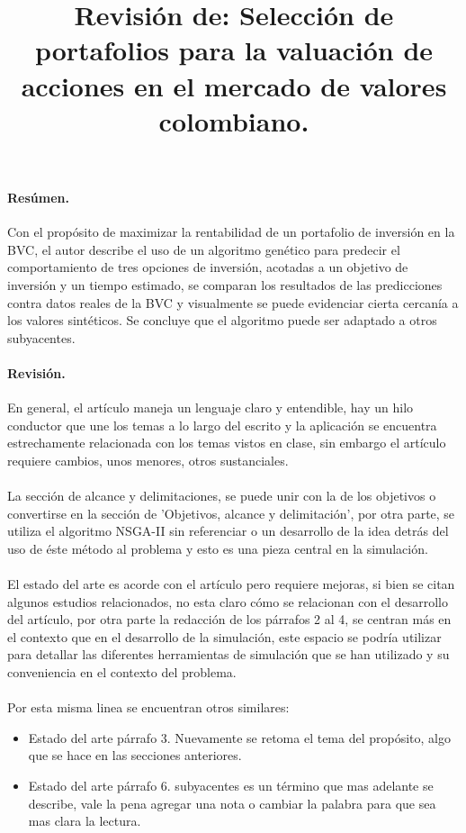 \documentclass{article}
\title{Revisión de: Selección de portafolios para la valuación de
	acciones en el mercado de valores colombiano.}
\begin{document}
	\maketitle
\doublespacing
\paragraph{Resúmen.} Con el propósito de maximizar la rentabilidad de un portafolio de inversión en la BVC, el autor describe el uso de un algoritmo genético para predecir el comportamiento de tres opciones de inversión, acotadas a un objetivo de inversión y un tiempo estimado, se comparan los resultados de las predicciones contra datos reales de la BVC y visualmente se puede evidenciar cierta cercanía a los valores sintéticos. Se concluye que el algoritmo puede ser adaptado a otros subyacentes.
\paragraph{Revisión.} En general, el artículo maneja un lenguaje claro y entendible, hay un hilo conductor que une los temas a lo largo del escrito y la aplicación se encuentra estrechamente relacionada con los temas vistos en clase, sin embargo el artículo requiere cambios, unos menores, otros sustanciales. 
\paragraph{}La sección de alcance y delimitaciones, se puede unir con la de los objetivos o convertirse en la sección de 'Objetivos, alcance y delimitación', por otra parte, se utiliza el algoritmo NSGA-II sin referenciar o un desarrollo de la idea detrás del uso de éste método al problema y esto es una pieza central en la simulación.
\paragraph{} El estado del arte es acorde con el artículo pero requiere mejoras, si bien se citan algunos estudios relacionados, no esta claro cómo se relacionan con el desarrollo del artículo, por otra parte la redacción de los párrafos 2 al 4, se centran más en el contexto que en el desarrollo de la simulación, este espacio se podría utilizar para detallar las diferentes herramientas de simulación que se han utilizado y su conveniencia en el contexto del problema.
\paragraph{}Por esta misma linea se encuentran otros similares:
\begin{itemize}
	\item Estado del arte párrafo 3. Nuevamente se retoma el tema del propósito, algo que se hace en las secciones anteriores.
	\item Estado del arte párrafo 6. subyacentes es un término que mas adelante se describe, vale la pena agregar una nota o cambiar la palabra para que sea mas clara la lectura.
\end{itemize}
\end{document}
